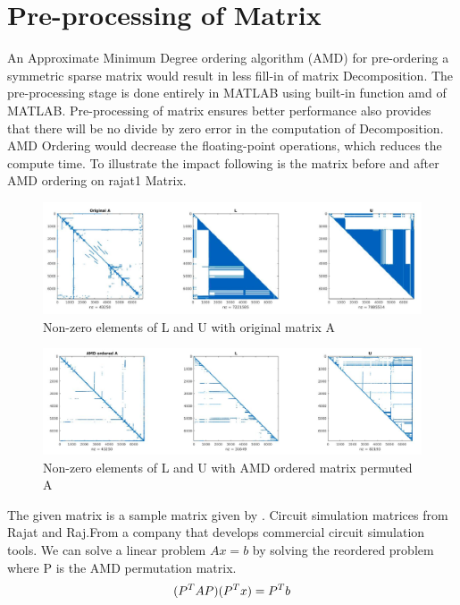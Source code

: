 \section{Pre-processing of Matrix}
An Approximate Minimum Degree ordering algorithm (AMD) for pre-ordering a symmetric sparse matrix would result in less fill-in of matrix  Decomposition. The pre-processing stage is done entirely in MATLAB using built-in function amd of MATLAB. Pre-processing of matrix ensures better performance also provides that there will be no divide by zero error in the computation of Decomposition.
AMD Ordering would decrease the floating-point operations, which reduces the compute time. To illustrate the impact following is the matrix before and after AMD ordering on rajat1 Matrix.


\begin{figure}[H]
    \centering
        \includegraphics[width = 0.95\linewidth]{./Theory/Original_A.png}
    \caption{Non-zero elements of L and U with original matrix A}
\end{figure}

\begin{figure}[H]
    \centering
        \includegraphics[width = 0.95\linewidth]{./Theory/AMD_A.png}
    \caption{ Non-zero elements of L and U with AMD ordered matrix permuted A}
\end{figure}

The given matrix is a sample matrix given by \cite{SparseSuite}. Circuit simulation matrices from Rajat and Raj.From a company that develops commercial circuit simulation tools.
We can solve a linear problem $Ax = b$ by solving the reordered problem where P is the AMD permutation matrix.
\begin{equation}
    \centering
    (P^TAP)(P^Tx) = P^Tb
    \label{eqn:AMD:ModifiedLinear}
\end{equation}


